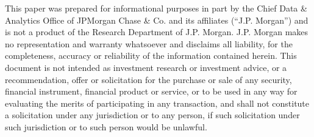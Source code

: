This paper was prepared for informational purposes in part by the Chief Data \& Analytics Office of JPMorgan Chase \& Co. and its affiliates (``J.P. Morgan'') and is not a product of the Research Department of J.P. Morgan. J.P. Morgan makes no representation and warranty whatsoever and disclaims all liability, for the completeness, accuracy or reliability of the information contained herein.  This document is not intended as investment research or investment advice, or a recommendation, offer or solicitation for the purchase or sale of any security, financial instrument, financial product or service, or to be used in any way for evaluating the merits of participating in any transaction, and shall not constitute a solicitation under any jurisdiction or to any person, if such solicitation under such jurisdiction or to such person would be unlawful.